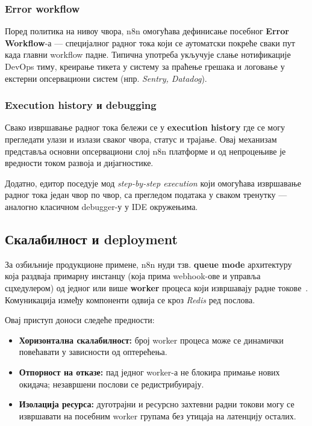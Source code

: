 \subsubsection{Error workflow}

Поред политика на нивоу чвора, n8n омогућава дефинисање посебног
\textbf{Error Workflow}-а — специјалног радног тока који се
аутоматски покреће сваки пут када главни workflow падне. Типична
употреба укључује слање нотификације DevOps тиму, креирање
тикета у систему за праћење грешака и логовање у екстерни
опсервациони систем (нпр. \textit{Sentry, Datadog}).

\subsubsection{Execution history и debugging}

Свако извршавање радног тока бележи се у \textbf{execution history}
где се могу прегледати улази и излази сваког чвора, статус и трајање.
Овај механизам представља основни опсервациони слој n8n платформе и
од непроцењиве је вредности током развоја и дијагностике.

Додатно, едитор поседује мод \textit{step-by-step execution} који
омогућава извршавање радног тока један чвор по чвор, са прегледом
података у сваком тренутку — аналогно класичном debugger-у у IDE
окружењима.

\subsection{Скалабилност и deployment}

За озбиљније продукционе примене, n8n нуди тзв. \textbf{queue mode}
архитектуру која раздваја примарну инстанцу (која прима webhook-ове и
управља сцхедулером) од једног или више \textbf{worker} процеса
који извршавају радне токове~\cite{n8n}. Комуникација између компоненти одвија
се кроз \textit{Redis} ред послова.

Овај приступ доноси следеће предности:
\begin{itemize}
    \item \textbf{Хоризонтална скалабилност:} број worker процеса
    може се динамички повећавати у зависности од оптерећења.
    \item \textbf{Отпорност на отказе:} пад једног worker-а не
    блокира примање нових окидача; незавршени послови се
    редистрибуирају.
    \item \textbf{Изолација ресурса:} дуготрајни и ресурсно захтевни
    радни токови могу се извршавати на посебним worker групама
    без утицаја на латенцију осталих.
\end{itemize}

